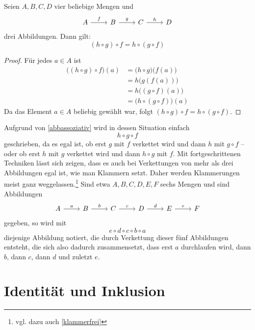 \begin{satz} \label{abbassoziativ}
    Seien $A,B,C,D$ vier beliebige Mengen und
    \[\begin{tikzcd}
        A \ar[r, "f"] & B \ar[r, "g"] & C \ar[r, "h"] & D
    \end{tikzcd}\]
    drei Abbildungen. Dann gilt:
        \[ (h\circ g)\circ f = h\circ (g\circ f)\]
\end{satz}
\begin{proof}
    Für jedes $a \in A$ ist
    \begin{align*}
        \bigl((h \circ g) \circ f\bigr) (a)	& = \bigl(h \circ g\bigr) \bigl(f(a)\bigr) \\
        & = h\bigl(g(f(a))\bigr) \\
        & = h\bigl((g \circ f)(a)\bigr) \\
        & = \bigl(h \circ (g \circ f)\bigr)(a)
    \end{align*}
    Da das Element $a\in A$ beliebig gewählt war, folgt $(h\circ g)\circ f = h\circ (g\circ f)$.
\end{proof}


\begin{bem} \label{abbklammerfrei}
    Aufgrund von \cref{abbassoziativ} wird in dessen Situation einfach
        \[ h\circ g\circ f \]
    geschrieben, da es egal ist, ob erst $g$ mit $f$ verkettet wird und dann $h$ mit $g\circ f$ -- oder ob erst $h$ mit $g$ verkettet wird und dann $h\circ g$ mit $f$. Mit fortgeschrittenen Techniken lässt sich zeigen, dass es auch bei Verkettungen von mehr als drei Abbildungen egal ist, wie man Klammern setzt. Daher werden Klammerungen meist ganz weggelassen.\footnote{vgl. dazu auch \cref{klammerfrei}} Sind etwa $A,B,C,D,E,F$ sechs Mengen und sind Abbildungen
    \[\begin{tikzcd}
        A \ar[r, "a"] & B \ar[r, "b"] & C \ar[r, "c"] & D \ar[r, "d"] & E \ar[r, "e"] & F
    \end{tikzcd}\]
    gegeben, so wird mit
        \[ e\circ d\circ c\circ b\circ a \]
    diejenige Abbildung notiert, die durch Verkettung dieser fünf Abbildungen entsteht, die sich also dadurch zusammensetzt, dass erst $a$ durchlaufen wird, dann $b$, dann $c$, dann $d$ und zuletzt $e$.
\end{bem}





\section{Identität und Inklusion}


